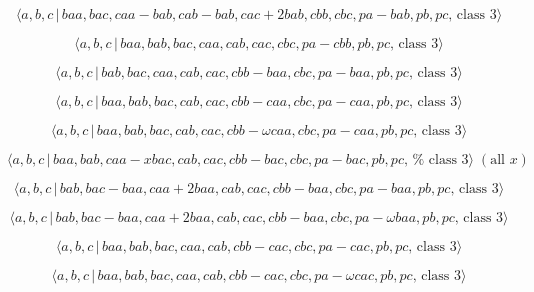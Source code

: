 \documentclass[10pt]{article}
\begin{document}
\begin{equation}
\langle a,b,c\,|\,baa,bac,caa-bab,cab-bab,cac+2bab,cbb,cbc,pa-bab,pb,pc,\,%
\text{class }3\rangle  \tag{7.1199}
\end{equation}

\begin{equation}
\langle a,b,c\,|\,baa,bab,bac,caa,cab,cac,cbc,pa-cbb,pb,pc,\,\text{class }%
3\rangle  \tag{7.1200}
\end{equation}

\begin{equation}
\langle a,b,c\,|\,bab,bac,caa,cab,cac,cbb-baa,cbc,pa-baa,pb,pc,\,\text{class 
}3\rangle  \tag{7.1201}
\end{equation}

\begin{equation}
\langle a,b,c\,|\,baa,bab,bac,cab,cac,cbb-caa,cbc,pa-caa,pb,pc,\,\text{class 
}3\rangle  \tag{7.1202}
\end{equation}

\begin{equation}
\langle a,b,c\,|\,baa,bab,bac,cab,cac,cbb-\omega caa,cbc,pa-caa,pb,pc,\,%
\text{class }3\rangle  \tag{7.1203}
\end{equation}

\begin{equation}
\langle a,b,c\,|\,baa,bab,caa-xbac,cab,cac,cbb-bac,cbc,pa-bac,pb,pc,\,\text{%
class }3\rangle \;(\text{all }x)  \tag{7.1204}
\end{equation}

\begin{equation}
\langle a,b,c\,|\,bab,bac-baa,caa+2baa,cab,cac,cbb-baa,cbc,pa-baa,pb,pc,\,%
\text{class }3\rangle  \tag{7.1205}
\end{equation}

\begin{equation}
\langle a,b,c\,|\,bab,bac-baa,caa+2baa,cab,cac,cbb-baa,cbc,pa-\omega
baa,pb,pc,\,\text{class }3\rangle  \tag{7.1206}
\end{equation}

\begin{equation}
\langle a,b,c\,|\,baa,bab,bac,caa,cab,cbb-cac,cbc,pa-cac,pb,pc,\,\text{class 
}3\rangle  \tag{7.1207}
\end{equation}

\begin{equation}
\langle a,b,c\,|\,baa,bab,bac,caa,cab,cbb-cac,cbc,pa-\omega cac,pb,pc,\,%
\text{class }3\rangle  \tag{7.1208}
\end{equation}
\end{document}
